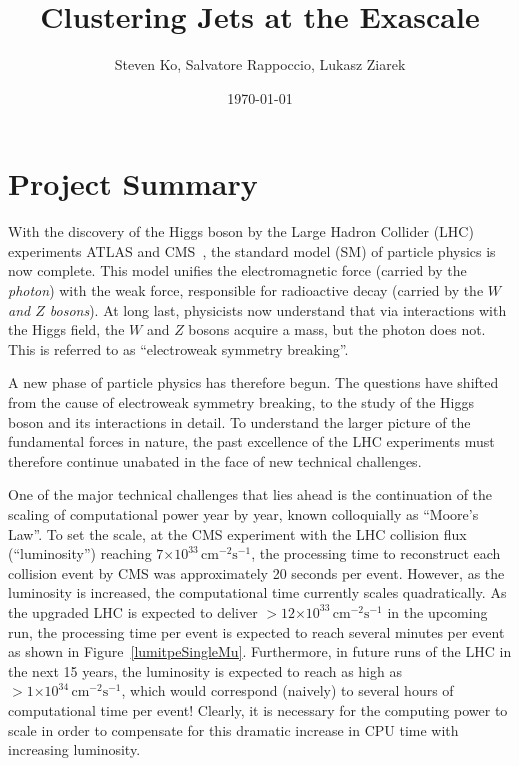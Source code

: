 \documentclass[12pt]{article}
\newcommand{\instlumiA}     {\ensuremath{\times 10^{33} \,\mathrm{cm}^{-2} \mathrm{s}^{-1}}}
\newcommand{\instlumiB}     {\ensuremath{\times 10^{34} \,\mathrm{cm}^{-2} \mathrm{s}^{-1}}}
\begin{document}
\title{Clustering Jets at the Exascale}

\author{Steven Ko, Salvatore Rappoccio, Lukasz Ziarek}

\date{\today}





\maketitle

\section{Project Summary}


With the discovery of the Higgs boson 
by the Large Hadron Collider (LHC)
experiments ATLAS and CMS~\cite{higgs_cms,higgs_atlas}, the
standard model (SM) of particle
physics is now complete. This model unifies the electromagnetic force
(carried by the {\em photon}) with the weak force, responsible for
radioactive decay (carried by the {\em $W$ and $Z$ bosons}).
At long last,
physicists now understand that via interactions with the Higgs field,
the $W$ and $Z$ bosons acquire a mass, but the photon does not. 
This is referred to as ``electroweak symmetry breaking''. 


A new phase of particle physics has therefore begun. 
The questions have shifted from the cause of electroweak symmetry
breaking, to the study of the Higgs boson and its interactions in
detail. To understand the larger picture of the fundamental forces in
nature, the past excellence of the LHC experiments must therefore
continue unabated in the face of new technical challenges. 


One of the major technical challenges that lies ahead is the
continuation of the scaling of computational power year by year, known
colloquially as ``Moore's Law''. 
To set the scale, at the CMS experiment
with the LHC collision flux (``luminosity'') reaching
$7\instlumiA$, the processing
time to reconstruct each collision event by CMS was approximately 20
seconds per event. However, as the luminosity is
increased, the computational time currently scales quadratically. As
the upgraded LHC is expected to deliver $>12\instlumiA$ in the
upcoming run, the processing time per event is expected to reach
several minutes per event as shown in
Figure~\ref{lumitpeSingleMu}. Furthermore, in future runs of the LHC
in the next 15 years, the luminosity is expected to reach as high as
$>1\instlumiB$, which would correspond (naively) to several hours of
computational time per event! Clearly, it is necessary for the
computing power to scale in order to compensate for this dramatic
increase in CPU time with increasing luminosity. 
\end{document}
